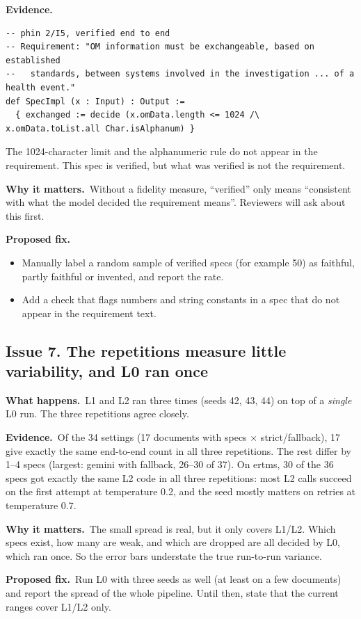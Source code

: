 \documentclass[10pt,a4paper]{article}
\newcommand{\what}{\par\smallskip\textbf{What happens.}~}
\newcommand{\evidence}{\par\smallskip\textbf{Evidence.}~}
\newcommand{\why}{\par\smallskip\textbf{Why it matters.}~}
\newcommand{\fix}{\par\smallskip\textbf{Proposed fix.}~}
\begin{document}
\evidence
\begin{lstlisting}
-- phin 2/I5, verified end to end
-- Requirement: "OM information must be exchangeable, based on established
--   standards, between systems involved in the investigation ... of a health event."
def SpecImpl (x : Input) : Output :=
  { exchanged := decide (x.omData.length <= 1024 /\ x.omData.toList.all Char.isAlphanum) }
\end{lstlisting}
The 1024-character limit and the alphanumeric rule do not appear in the requirement. This spec is verified, but what was
verified is not the requirement.

\why Without a fidelity measure, ``verified'' only means ``consistent with what the model decided the requirement means''.
Reviewers will ask about this first.

\fix
\begin{itemize}
\item Manually label a random sample of verified specs (for example 50) as faithful, partly faithful or invented, and report the rate.
\item Add a check that flags numbers and string constants in a spec that do not appear in the requirement text.
\end{itemize}

\subsection*{Issue 7. The repetitions measure little variability, and L0 ran once}
\what L1 and L2 ran three times (seeds 42, 43, 44) on top of a \emph{single} L0 run. The three repetitions agree closely.

\evidence Of the 34 settings (17 documents with specs $\times$ strict/fallback), 17 give exactly the same end-to-end count in
all three repetitions. The rest differ by 1--4 specs (largest: gemini with fallback, 26--30 of 37). On ertms, 30 of the 36
specs got exactly the same L2 code in all three repetitions: most L2 calls succeed on the first attempt at temperature 0.2,
and the seed mostly matters on retries at temperature 0.7.

\why The small spread is real, but it only covers L1/L2. Which specs exist, how many are weak, and which are dropped are all
decided by L0, which ran once. So the error bars understate the true run-to-run variance.

\fix Run L0 with three seeds as well (at least on a few documents) and report the spread of the whole pipeline. Until then,
state that the current ranges cover L1/L2 only.
\end{document}
